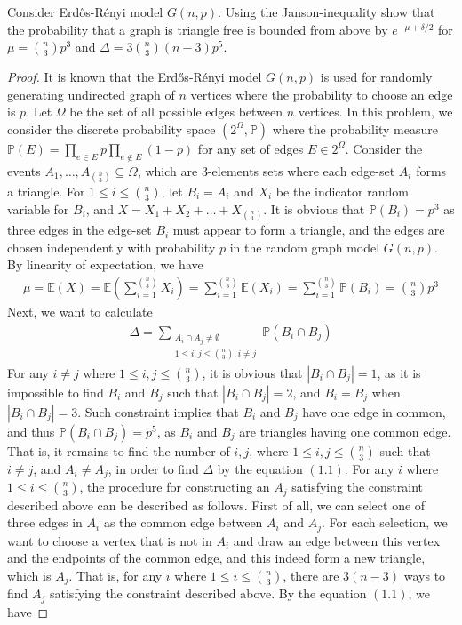\begin{problem}
  Consider Erdős-Rényi model $G(n,p)$. Using the Janson-inequality show that the probability that a graph is triangle free is bounded from above by $e^{-\mu + \delta/2}$ for $\mu = \binom{n}{3} p^{3}$ and $\Delta = 3 \binom{n}{3} (n-3) p^{5}$.
\end{problem}
\begin{proof}
  It is known that the Erdős-Rényi model $G(n,p)$ is used for randomly generating undirected graph of $n$ vertices where the probability to choose an edge is $p$. Let $\Omega$ be the set of all possible edges between $n$ vertices. In this problem, we consider the discrete probability space $(2^{\Omega}, \mathbb{P})$ where the probability measure $\mathbb{P}(E) = \prod\limits_{e \in E}p\prod\limits_{e \notin E}(1-p)$ for any set of edges $E \in 2^{\Omega}$. Consider the events $A_{1}, \ldots, A_{\binom{n}{3}} \subseteq \Omega$, which are $3$-elements sets where each edge-set $A_{i}$ forms a triangle. For $1 \leq i \leq \binom{n}{3}$, let $B_{i}=A_{i}$ and $X_{i}$ be the indicator random variable for $B_{i}$, and $X = X_{1} + X_{2} + \ldots + X_{\binom{n}{3}}$. It is obvious that $\mathbb{P}(B_{i}) = p^{3}$ as three edges in the edge-set $B_{i}$ must appear to form a triangle, and the edges are chosen independently with probability $p$ in the random graph model $G(n,p)$. By linearity of expectation, we have
  \begin{align*}
    \mu = \mathbb{E}(X) = \mathbb{E}(\sum\limits_{i=1}^{\binom{n}{3}} X_{i})  = \sum\limits_{i=1}^{\binom{n}{3}} \mathbb{E}(X_{i}) = \sum\limits_{i=1}^{\binom{n}{3}} \mathbb{P}(B_{i}) = \binom{n}{3}p^{3}
  \end{align*}
  Next, we want to calculate
  \begin{align*}
    \Delta = \sum\limits_{\substack{A_{i} \cap A_{j} \neq \emptyset \\ 1 \leq i,j \leq \binom{n}{3}, i \neq j}} \mathbb{P}(B_{i} \cap B_{j}) \tag{1.1}
  \end{align*}
  For any $i \neq j$ where $1 \le i,j \leq \binom{n}{3}$, it is obvious that $|B_{i} \cap B_{j}| = 1$, as it is impossible to find $B_{i}$ and $B_{j}$ such that $|B_{i} \cap B_{j}| = 2$, and $B_{i} = B_{j}$ when $|B_{i} \cap B_{j}| = 3$. Such constraint implies that $B_{i}$ and $B_{j}$ have one edge in common, and thus $\mathbb{P}(B_{i} \cap B_{j}) = p^{5}$, as $B_{i}$ and $B_{j}$ are triangles having one common edge. That is, it remains to find the number of $i,j$, where $1 \leq i,j \leq \binom{n}{3}$ such that $i \neq j$, and $A_{i} \neq A_{j}$, in order to find $\Delta$ by the equation $(1.1)$. For any $i$ where $1 \leq i \leq \binom{n}{3}$, the procedure for constructing an $A_{j}$ satisfying the constraint described above can be described as follows. First of all, we can select one of three edges in $A_{i}$ as the common edge between $A_{i}$ and $A_{j}$. For each selection, we want to choose a vertex that is not in $A_{i}$ and draw an edge between this vertex and the endpoints of the common edge, and this indeed form a new triangle, which is $A_{j}$. That is, for any $i$ where $1 \leq i \leq \binom{n}{3}$, there are $3(n-3)$ ways to find $A_{j}$ satisfying the constraint described above. By the equation $(1.1)$, we have

\end{proof}
